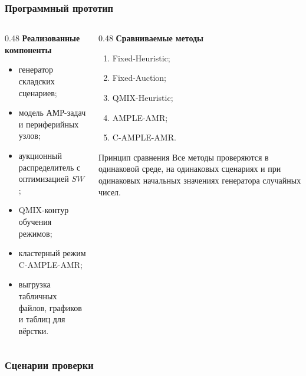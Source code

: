 \begin{frame}
    \frametitle{Программный прототип}
    \small
    \begin{columns}[T,onlytextwidth]
        \begin{column}{0.48\textwidth}
            \textbf{Реализованные компоненты}
            \begin{itemize}
                \item генератор складских сценариев;
                \item модель АМР-задач и периферийных узлов;
                \item аукционный распределитель с оптимизацией $SW$;
                \item QMIX-контур обучения режимов;
                \item кластерный режим C-AMPLE-AMR;
                \item выгрузка табличных файлов, графиков и таблиц для вёрстки.
            \end{itemize}
        \end{column}
        \begin{column}{0.48\textwidth}
            \textbf{Сравниваемые методы}
            \begin{enumerate}
                \item Fixed-Heuristic;
                \item Fixed-Auction;
                \item QMIX-Heuristic;
                \item AMPLE-AMR;
                \item C-AMPLE-AMR.
            \end{enumerate}
            \medskip
            \begin{block}{Принцип сравнения}
                Все методы проверяются в одинаковой среде, на одинаковых сценариях и при одинаковых начальных значениях генератора случайных чисел.
            \end{block}
        \end{column}
    \end{columns}
\end{frame}

\begin{frame}
	\frametitle{Сценарии проверки}
	\small
	\begin{center}
	\end{center}
\end{frame}

